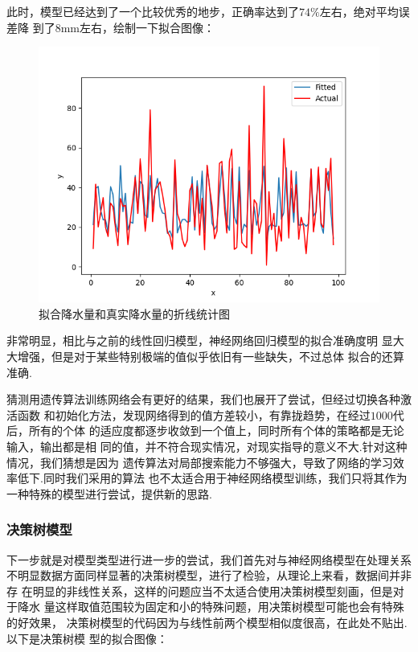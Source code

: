\documentclass[UTF8, a4paper]{ctexart}
\begin{document}
此时，模型已经达到了一个比较优秀的地步，正确率达到了$74\%$左右，绝对平均误差降
到了$8$\si{\milli\meter}左右，绘制一下拟合图像：

\begin{figure}[h!]
	\centering
	\includegraphics[scale=0.3]{success.png}
	\caption{拟合降水量和真实降水量的折线统计图}
\end{figure}

非常明显，相比与之前的线性回归模型，神经网络回归模型的拟合准确度明
显大大增强，但是对于某些特别极端的值似乎依旧有一些缺失，不过总体
拟合的还算准确.

猜测用遗传算法训练网络会有更好的结果，我们也展开了尝试，但经过切换各种激活函数
和初始化方法，发现网络得到的值方差较小，有靠拢趋势，在经过$1000$代后，所有的个体
的适应度都逐步收敛到一个值上，同时所有个体的策略都是无论输入，输出都是相
同的值，并不符合现实情况，对现实指导的意义不大.针对这种情况，我们猜想是因为
遗传算法对局部搜索能力不够强大，导致了网络的学习效率低下.同时我们采用的算法
也不太适合用于神经网络模型训练，我们只将其作为一种特殊的模型进行尝试，提供新的思路.

\subsubsection{决策树模型}

下一步就是对模型类型进行进一步的尝试，我们首先对与神经网络模型在处理关系
不明显数据方面同样显著的决策树模型，进行了检验，从理论上来看，数据间并非存
在明显的非线性关系，这样的问题应当不太适合使用决策树模型刻画，但是对于降水
量这样取值范围较为固定和小的特殊问题，用决策树模型可能也会有特殊的好效果，
决策树模型的代码因为与线性前两个模型相似度很高，在此处不贴出.以下是决策树模
型的拟合图像：
\end{document}
